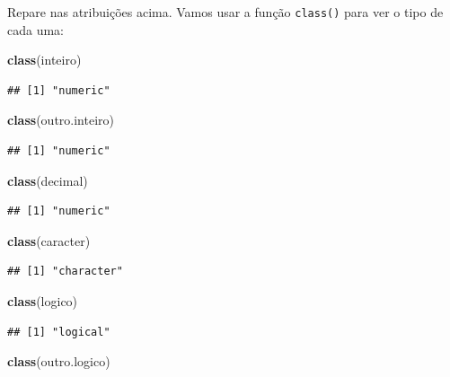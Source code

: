 \documentclass[]{book}
\newenvironment{Shaded}{\begin{snugshade}}{\end{snugshade}}
\newcommand{\KeywordTok}[1]{\textcolor[rgb]{0.13,0.29,0.53}{\textbf{#1}}}
\newcommand{\NormalTok}[1]{#1}
\begin{document}
Repare nas atribuições acima. Vamos usar a função \texttt{class()} para
ver o tipo de cada uma:

\begin{Shaded}
\begin{Highlighting}[]
\KeywordTok{class}\NormalTok{(inteiro)}
\end{Highlighting}
\end{Shaded}

\begin{verbatim}
## [1] "numeric"
\end{verbatim}

\begin{Shaded}
\begin{Highlighting}[]
\KeywordTok{class}\NormalTok{(outro.inteiro)}
\end{Highlighting}
\end{Shaded}

\begin{verbatim}
## [1] "numeric"
\end{verbatim}

\begin{Shaded}
\begin{Highlighting}[]
\KeywordTok{class}\NormalTok{(decimal)}
\end{Highlighting}
\end{Shaded}

\begin{verbatim}
## [1] "numeric"
\end{verbatim}

\begin{Shaded}
\begin{Highlighting}[]
\KeywordTok{class}\NormalTok{(caracter)}
\end{Highlighting}
\end{Shaded}

\begin{verbatim}
## [1] "character"
\end{verbatim}

\begin{Shaded}
\begin{Highlighting}[]
\KeywordTok{class}\NormalTok{(logico)}
\end{Highlighting}
\end{Shaded}

\begin{verbatim}
## [1] "logical"
\end{verbatim}

\begin{Shaded}
\begin{Highlighting}[]
\KeywordTok{class}\NormalTok{(outro.logico)}
\end{Highlighting}
\end{Shaded}
\end{document}
